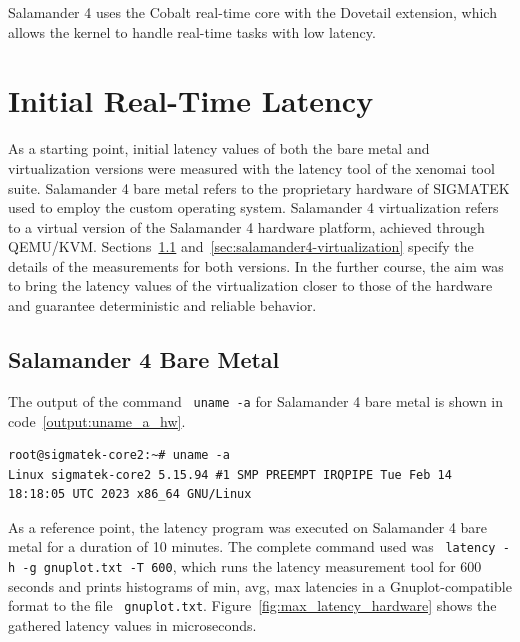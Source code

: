 \documentclass[MMR,Master,english]{twbook}
\begin{document}
\noindent Salamander 4 uses the Cobalt real-time core with the Dovetail extension, which allows the kernel to handle real-time tasks with low latency.

\clearpage

\chapter{Initial Real-Time Latency}\label{cha:initial-real-time-latency}

As a starting point, initial latency values of both the bare metal and virtualization versions were measured with the latency tool of the xenomai tool suite. Salamander 4 bare metal refers to the proprietary hardware of SIGMATEK used to employ the custom operating system. Salamander 4 virtualization refers to a virtual version of the Salamander 4 hardware platform, achieved through QEMU/KVM. Sections~\ref{sec:salamander4-bare-metal} and~\ref{sec:salamander4-virtualization} specify the details of the measurements for both versions. In the further course, the aim was to bring the latency values of the virtualization closer to those of the hardware and guarantee deterministic and reliable behavior. 

\section{Salamander 4 Bare Metal}\label{sec:salamander4-bare-metal}
The output of the command ~\texttt{uname -a} for Salamander 4 bare metal is shown in code~\ref{output:uname_a_hw}.

\vspace{1em}
\begin{minipage}{0.95\columnwidth}
	\begin{lstlisting}[name={Salamander 4 bare metal system information},label={output:uname_a_hw}]
root@sigmatek-core2:~# uname -a 
Linux sigmatek-core2 5.15.94 #1 SMP PREEMPT IRQPIPE Tue Feb 14 18:18:05 UTC 2023 x86_64 GNU/Linux
\end{lstlisting}
\end{minipage}

\noindent As a reference point, the latency program was executed on Salamander 4 bare metal for a duration of 10 minutes. The complete command used was ~\texttt{latency -h -g gnuplot.txt -T 600}, which runs the latency measurement tool for 600 seconds and prints histograms of min, avg, max latencies in a Gnuplot-compatible format to the file ~\texttt{gnuplot.txt}. Figure~\ref{fig:max_latency_hardware} shows the gathered latency values in microseconds.
\end{document}
